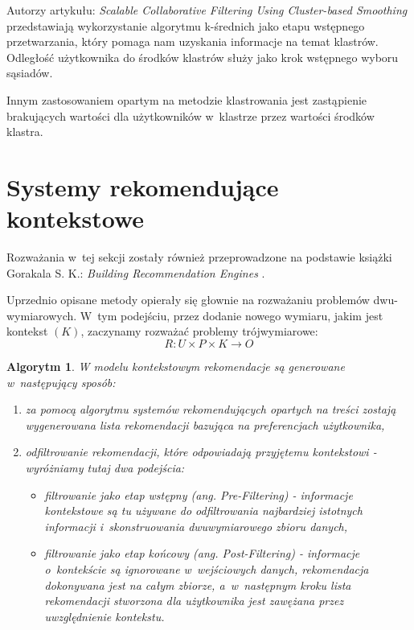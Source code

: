 \documentclass[12pt,a4paper]{report}
\newtheorem{algorytm}[df]{Algorytm}
\newcommand{\setUzytkownicy}{\mathit{U}}
\newcommand{\setPrzedmioty}{\mathit{P}}
\newcommand{\setOceny}{\mathit{O}}
\newcommand{\setKontekst}{\mathit{K}}
\begin{document}
Autorzy artykułu: \textit{Scalable Collaborative Filtering Using Cluster-based Smoothing} {\citep{cgfucbs}} przedstawiają wykorzystanie algorytmu k-średnich jako etapu wstępnego przetwarzania, który pomaga nam uzyskania informacje na temat klastrów. Odległość użytkownika do środków klastrów służy jako krok wstępnego wyboru sąsiadów. 

Innym zastosowaniem opartym na metodzie klastrowania jest zastąpienie brakujących wartości dla użytkowników w~klastrze przez wartości środków klastra.

\section{Systemy rekomendujące kontekstowe}
Rozważania w~tej sekcji zostały również przeprowadzone na podstawie książki Gorakala S. K.: \textit{Building Recommendation Engines} {\citep[Sec 3]{bre}}.
\bigskip

Uprzednio opisane metody opierały się głownie na rozważaniu problemów dwu-wymiarowych. W~tym podejściu, przez dodanie nowego wymiaru, jakim jest kontekst $(K)$, zaczynamy rozważać problemy trójwymiarowe:
$$
R: \setUzytkownicy \times \setPrzedmioty \times \setKontekst  \rightarrow \setOceny
$$

\begin{algorytm}
W modelu kontekstowym rekomendacje są generowane w~następujący sposób:
\begin{enumerate}
\item za pomocą algorytmu systemów rekomendujących opartych na treści zostają wygenerowana lista rekomendacji bazująca na  preferencjach użytkownika,
\item odfiltrowanie rekomendacji, które odpowiadają przyjętemu kontekstowi - 
wyróżniamy tutaj dwa podejścia:
\begin{itemize}
\item filtrowanie jako etap wstępny (ang. Pre-Filtering) - informacje kontekstowe są tu używane do odfiltrowania najbardziej istotnych informacji i~skonstruowania dwuwymiarowego zbioru danych,
\item filtrowanie jako etap końcowy (ang. Post-Filtering) - informacje o~kontekście są ignorowane w~wejściowych danych, rekomendacja dokonywana jest na całym zbiorze, a~w~następnym kroku lista rekomendacji stworzona dla użytkownika jest zawężana przez uwzględnienie kontekstu.
\end{itemize}
\end{enumerate}
\end{algorytm}
\end{document}
